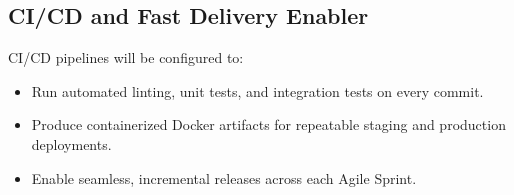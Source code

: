 \documentclass[11pt,a4paper]{article}
\begin{document}

\subsection{CI/CD and Fast Delivery Enabler}

CI/CD pipelines will be configured to:

\begin{itemize}[leftmargin=0.7cm]

\item Run automated linting, unit tests, and integration tests on every commit.

\item Produce containerized Docker artifacts for repeatable staging and production deployments.

\item Enable seamless, incremental releases across each Agile Sprint.

\end{itemize}

\end{document}
